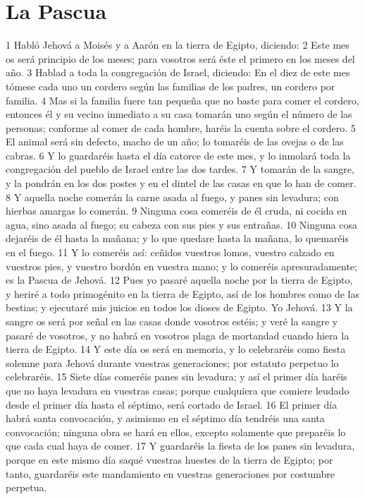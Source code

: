 \section*{La Pascua}
1 Habló Jehová a Moisés y a Aarón en la tierra de Egipto, diciendo:
2 Este mes os será principio de los meses; para vosotros será éste el primero en los meses del año.
3 Hablad a toda la congregación de Israel, diciendo: En el diez de este mes tómese cada uno un cordero según las familias de los padres, un cordero por familia.
4 Mas si la familia fuere tan pequeña que no baste para comer el cordero, entonces él y su vecino inmediato a su casa tomarán uno según el número de las personas; conforme al comer de cada hombre, haréis la cuenta sobre el cordero.
5 El animal será sin defecto, macho de un año; lo tomaréis de las ovejas o de las cabras.
6 Y lo guardaréis hasta el día catorce de este mes, y lo inmolará toda la congregación del pueblo de Israel entre las dos tardes.
7 Y tomarán de la sangre, y la pondrán en los dos postes y en el dintel de las casas en que lo han de comer.
8 Y aquella noche comerán la carne asada al fuego, y panes sin levadura; con hierbas amargas lo comerán.
9 Ninguna cosa comeréis de él cruda, ni cocida en agua, sino asada al fuego; su cabeza con sus pies y sus entrañas.
10 Ninguna cosa dejaréis de él hasta la mañana; y lo que quedare hasta la mañana, lo quemaréis en el fuego.
11 Y lo comeréis así: ceñidos vuestros lomos, vuestro calzado en vuestros pies, y vuestro bordón en vuestra mano; y lo comeréis apresuradamente; es la Pascua de Jehová.
12 Pues yo pasaré aquella noche por la tierra de Egipto, y heriré a todo primogénito en la tierra de Egipto, así de los hombres como de las bestias; y ejecutaré mis juicios en todos los dioses de Egipto. Yo Jehová.
13 Y la sangre os será por señal en las casas donde vosotros estéis; y veré la sangre y pasaré de vosotros, y no habrá en vosotros plaga de mortandad cuando hiera la tierra de Egipto.
14 Y este día os será en memoria, y lo celebraréis como fiesta solemne para Jehová durante vuestras generaciones; por estatuto perpetuo lo celebraréis.
15 Siete días comeréis panes sin levadura; y así el primer día haréis que no haya levadura en vuestras casas; porque cualquiera que comiere leudado desde el primer día hasta el séptimo, será cortado de Israel.
16 El primer día habrá santa convocación, y asimismo en el séptimo día tendréis una santa convocación; ninguna obra se hará en ellos, excepto solamente que preparéis lo que cada cual haya de comer.
17 Y guardaréis la fiesta de los panes sin levadura, porque en este mismo día saqué vuestras huestes de la tierra de Egipto; por tanto, guardaréis este mandamiento en vuestras generaciones por costumbre perpetua.
